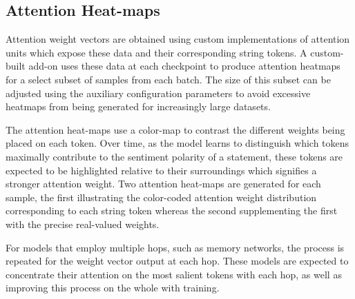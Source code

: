 \documentclass[../../fyp.tex]{subfiles}
\begin{document}
\subsection{Attention Heat-maps}
Attention weight vectors are obtained using custom implementations of attention units which expose these data and their corresponding string tokens. A custom-built add-on uses these data at each checkpoint to produce attention heatmaps for a select subset of samples from each batch. The size of this subset can be adjusted using the auxiliary configuration parameters to avoid excessive heatmaps from being generated for increasingly large datasets. 

The attention heat-maps use a color-map to contrast the different weights being placed on each token. Over time, as the model learns to distinguish which tokens maximally contribute to the sentiment polarity of a statement, these tokens are expected to be highlighted relative to their surroundings which signifies a stronger attention weight. Two attention heat-maps are generated for each sample, the first illustrating the color-coded attention weight distribution corresponding to each string token whereas the second supplementing the first with the precise real-valued weights.

For models that employ multiple hops, such as memory networks, the process is repeated for the weight vector output at each hop. These models are expected to concentrate their attention on the most salient tokens with each hop, as well as improving this process on the whole with training.
\end{document}
